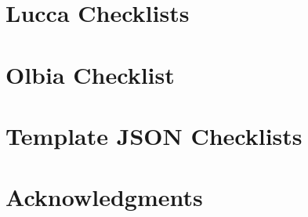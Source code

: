 \documentclass[a4paper,english,noexaminfo]{sapthesis}
\begin{document}
\appendix
\chapter{Lucca Checklists}


\chapter{Olbia Checklist}



\chapter{Template JSON Checklists}



%

%



\chapter{Acknowledgments}


%
\end{document}
